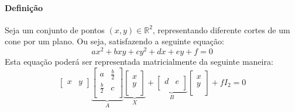 \documentclass{article}
\begin{document}
            \paragraph{Definição}Seja um conjunto de pontos $(x, y) \in \mathbb{R}^{2}$, representando diferente cortes de um cone por um plano. Ou seja, satisfazendo a seguinte equação:
                \[\boxed{ax^{2} + bxy + cy^{2} + dx + ey + f = 0}\]
            Esta equação poderá ser representada matricialmente da seguinte maneira:
                \[
                    \begin{bmatrix}
                        x & y
                    \end{bmatrix}
                    \underbrace{
                        \begin{bmatrix}
                        a           & \frac{b}{2}\\
                        \frac{b}{2} & c\\
                    \end{bmatrix}
                    }_{A}
                    \underbrace{
                    \begin{bmatrix}
                        x\\
                        y\\
                    \end{bmatrix}
                     }_{X} +
                    \underbrace{
                    \begin{bmatrix}
                        d & e\\
                    \end{bmatrix}
                    }_{B}
                    \begin{bmatrix}
                        x\\
                        y\\
                    \end{bmatrix} +
                    f I_{2} = 0
                \]
\end{document}

